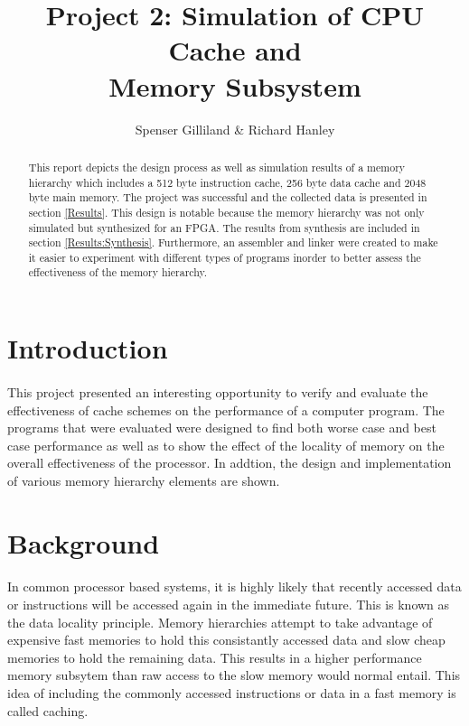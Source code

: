 \documentclass[11pt,letterpaper,]{article}
\author{Spenser Gilliland \& Richard Hanley}
\title{Project 2: Simulation of CPU Cache and \\ Memory Subsystem}
\begin{document}
\maketitle
\bigskip
\bigskip
\bigskip

\doublespacing

\begin{abstract}
This report depicts the design process as well as simulation results of a memory hierarchy which includes a 512 byte instruction cache, 256 byte data cache and 2048 byte main memory.  The project was successful and the collected data is presented in section \ref{Results}.  This design is notable because the memory hierarchy was not only simulated but synthesized for an FPGA.  The results from synthesis are included in section \ref{Results:Synthesis}.  Furthermore, an assembler and linker were created to make it easier to experiment with different types of programs inorder to better assess the effectiveness of the memory hierarchy.
\end{abstract}

\pagebreak
\section{ Introduction }
\paragraph{}
This project presented an interesting opportunity to verify and evaluate the effectiveness of cache schemes on the performance of a computer program.  The programs that were evaluated were designed to find both worse case and best case performance as well as to show the effect of the locality of memory on the overall effectiveness of the processor. In addtion, the design and implementation of various memory hierarchy elements are shown.

\section{ Background }
\paragraph{}
In common processor based systems, it is highly likely that recently accessed data or instructions will be accessed again in the immediate future.  This is known as the data locality principle.  Memory hierarchies attempt to take advantage of expensive fast memories to hold this consistantly accessed data and slow cheap memories to hold the remaining data.  This results in a higher performance memory subsytem than raw access to the slow memory would normal entail.  This idea of including the commonly accessed instructions or data in a fast memory is called caching.
\end{document}
